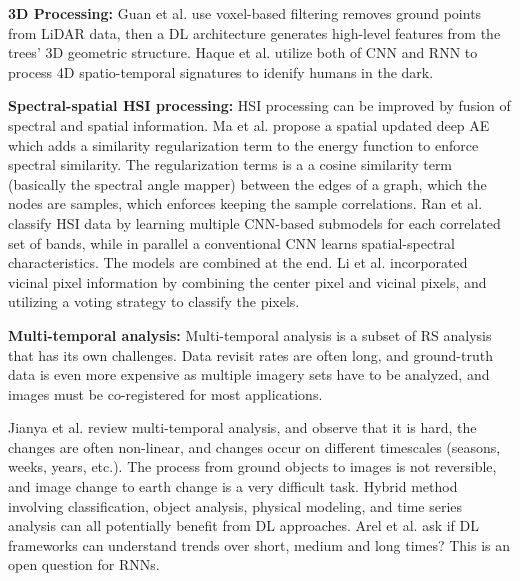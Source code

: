 \documentclass[12pt]{spieman}
\begin{document}
\begin{spacing}{1}
%
%
\textbf{3D Processing:} Guan et al. \cite{Guan2015Deep} use voxel-based filtering removes ground points from LiDAR data, then a DL architecture generates high-level features from the trees’ 3D geometric structure. Haque et al. \cite{Haque2016} utilize both of CNN and RNN to process 4D spatio-temporal signatures to idenify humans in the dark.


%
%
\textbf{Spectral-spatial HSI processing:} HSI processing can be improved by fusion of spectral and spatial information. Ma et al. \cite{ma2016spectral} propose a spatial updated deep AE which adds a similarity regularization term to the energy function to enforce spectral similarity. The regularization terms is a a cosine similarity term (basically the spectral angle mapper) between the edges of a graph, which the nodes are samples, which enforces keeping the sample correlations. Ran et al. \cite{ran2016bands} classify HSI data by learning multiple  CNN-based submodels for each correlated set of bands, while in parallel a conventional CNN learns spatial-spectral characteristics. The models are combined at the end. Li et al. \cite{li2017hyperspectral} incorporated vicinal pixel information by combining the center pixel and vicinal pixels, and utilizing a voting strategy to classify the pixels.

%
%
\textbf{Multi-temporal analysis:} Multi-temporal analysis is a subset of RS analysis that has its own challenges. Data revisit rates are often long, and ground-truth data is even more expensive as multiple imagery sets have to be analyzed, and images must be co-registered for most applications.

Jianya et al. \cite{jianya2008review} review multi-temporal analysis, and observe that it is hard, the changes are often non-linear, and changes occur on different timescales (seasons, weeks, years, etc.). The process from ground objects to images is not reversible, and image change to earth change is a very difficult task. Hybrid method involving classification, object analysis, physical modeling, and time series analysis can all potentially benefit from DL approaches. Arel et al. \cite{Arel2010} ask if DL frameworks can understand trends over short, medium and long times? This is an open question for RNNs.


\end{spacing}
\end{document}
